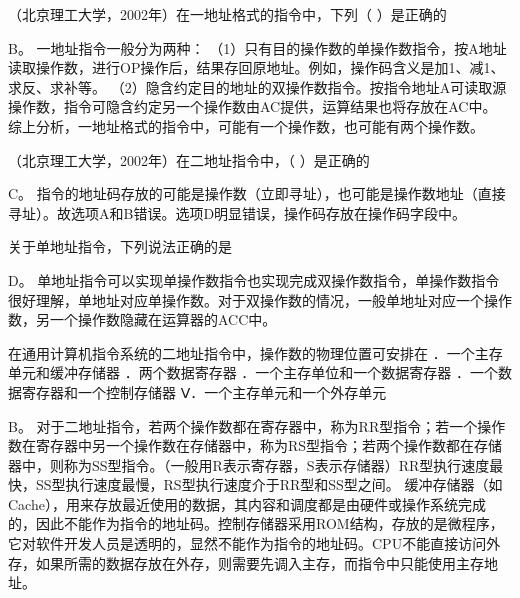 \question （北京理工大学，2002年）在一地址格式的指令中，下列（ ）是正确的
\par{}
\begin{solution}B。 一地址指令一般分为两种：
（1）只有目的操作数的单操作数指令，按A地址读取操作数，进行OP操作后，结果存回原地址。例如，操作码含义是加1、减1、求反、求补等。
（2）隐含约定目的地址的双操作数指令。按指令地址A可读取源操作数，指令可隐含约定另一个操作数由AC提供，运算结果也将存放在AC中。
综上分析，一地址格式的指令中，可能有一个操作数，也可能有两个操作数。
\end{solution}
\question （北京理工大学，2002年）在二地址指令中，（ ）是正确的
\par{}
\begin{solution}C。
指令的地址码存放的可能是操作数（立即寻址），也可能是操作数地址（直接寻址）。故选项A和B错误。选项D明显错误，操作码存放在操作码字段中。
\end{solution}
\question 关于单地址指令，下列说法正确的是
\par{}
\begin{solution}D。
单地址指令可以实现单操作数指令也实现完成双操作数指令，单操作数指令很好理解，单地址对应单操作数。对于双操作数的情况，一般单地址对应一个操作数，另一个操作数隐藏在运算器的ACC中。
\end{solution}
\question 在通用计算机指令系统的二地址指令中，操作数的物理位置可安排在
．一个主存单元和缓冲存储器 ．两个数据寄存器
．一个主存单位和一个数据寄存器 ．一个数据寄存器和一个控制存储器
Ⅴ．一个主存单元和一个外存单元
\par{}
\begin{solution}B。
对于二地址指令，若两个操作数都在寄存器中，称为RR型指令；若一个操作数在寄存器中另一个操作数在存储器中，称为RS型指令；若两个操作数都在存储器中，则称为SS型指令。（一般用R表示寄存器，S表示存储器）RR型执行速度最快，SS型执行速度最慢，RS型执行速度介于RR型和SS型之间。
缓冲存储器（如Cache），用来存放最近使用的数据，其内容和调度都是由硬件或操作系统完成的，因此不能作为指令的地址码。控制存储器采用ROM结构，存放的是微程序，它对软件开发人员是透明的，显然不能作为指令的地址码。CPU不能直接访问外存，如果所需的数据存放在外存，则需要先调入主存，而指令中只能使用主存地址。
\end{solution}

